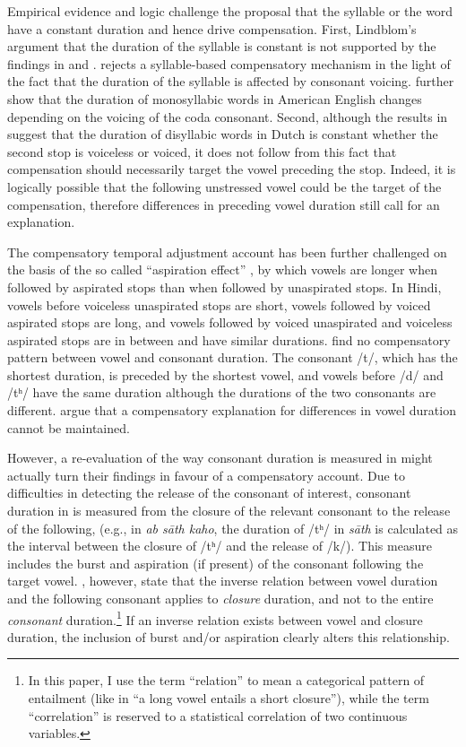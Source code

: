 \documentclass[charis]{glossa}
\begin{document}
Empirical evidence and logic challenge the proposal that the syllable or
the word have a constant duration and hence drive compensation. First,
Lindblom's \citeyear{lindblom1967} argument that the duration of the
syllable is constant is not supported by the findings in
\citet{chen1970} and \citet{jacewicz2009}. \citet{chen1970} rejects a
syllable-based compensatory mechanism in the light of the fact that the
duration of the syllable is affected by consonant voicing.
\citet{jacewicz2009} further show that the duration of monosyllabic
words in American English changes depending on the voicing of the coda
consonant. Second, although the results in \citet{slis1969} suggest that
the duration of disyllabic words in Dutch is constant whether the second
stop is voiceless or voiced, it does not follow from this fact that
compensation should necessarily target the vowel preceding the stop.
Indeed, it is logically possible that the following unstressed vowel
could be the target of the compensation, therefore differences in
preceding vowel duration still call for an explanation.

The compensatory temporal adjustment account has been further challenged
on the basis of the so called ``aspiration effect''
\citep{maddieson1976}, by which vowels are longer when followed by
aspirated stops than when followed by unaspirated stops. In Hindi,
vowels before voiceless unaspirated stops are short, vowels followed by
voiced aspirated stops are long, and vowels followed by voiced
unaspirated and voiceless aspirated stops are in between and have
similar durations. \citet{maddieson1976} find no compensatory pattern
between vowel and consonant duration. The consonant /t/, which has the
shortest duration, is preceded by the shortest vowel, and vowels before
/d/ and /tʰ/ have the same duration although the durations of the two
consonants are different. \citet{maddieson1976} argue that a
compensatory explanation for differences in vowel duration cannot be
maintained.

However, a re-evaluation of the way consonant duration is measured in
\citet{maddieson1976} might actually turn their findings in favour of a
compensatory account. Due to difficulties in detecting the release of
the consonant of interest, consonant duration in \citet{maddieson1976}
is measured from the closure of the relevant consonant to the release of
the following, (e.g., in \emph{ab sāth kaho}, the duration of /tʰ/ in
\emph{sāth} is calculated as the interval between the closure of /tʰ/
and the release of /k/). This measure includes the burst and aspiration
(if present) of the consonant following the target vowel.
\citet{slis1969a}, however, state that the inverse relation between
vowel duration and the following consonant applies to \textit{closure}
duration, and not to the entire \textit{consonant}
duration.\footnote{In this paper, I use the term ``relation'' to mean a categorical pattern of entailment (like in ``a long vowel entails a short closure''), while the term ``correlation'' is reserved to a statistical correlation of two continuous variables.}
If an inverse relation exists between vowel and closure duration, the
inclusion of burst and/or aspiration clearly alters this relationship.
\end{document}
